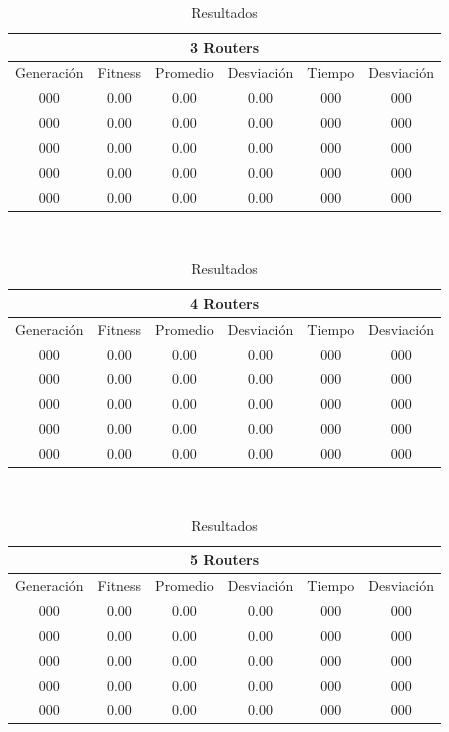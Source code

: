 \documentclass[journal]{IEEEtran}
\begin{document}
\begin{table}[h]
\caption{Resultados}
\centering

\begin{tabular}{|c||c|c|c||c|c|}
\hline
\multicolumn{6}{|c|}{3 Routers}\\
\hline
Generación & Fitness & Promedio & Desviación & Tiempo & Desviación \\
\hline
000 & 0.00 & 0.00 & 0.00 & 000 & 000 \\
000 & 0.00 & 0.00 & 0.00 & 000 & 000 \\
000 & 0.00 & 0.00 & 0.00 & 000 & 000 \\
000 & 0.00 & 0.00 & 0.00 & 000 & 000 \\
000 & 0.00 & 0.00 & 0.00 & 000 & 000 \\
\hline
\end{tabular}
\\[2ex]

\begin{tabular}{|c||c|c|c||c|c|}
\hline
\multicolumn{6}{|c|}{4 Routers}\\
\hline
Generación & Fitness & Promedio & Desviación & Tiempo & Desviación \\
\hline
000 & 0.00 & 0.00 & 0.00 & 000 & 000 \\
000 & 0.00 & 0.00 & 0.00 & 000 & 000 \\
000 & 0.00 & 0.00 & 0.00 & 000 & 000 \\
000 & 0.00 & 0.00 & 0.00 & 000 & 000 \\
000 & 0.00 & 0.00 & 0.00 & 000 & 000 \\
\hline
\end{tabular}
\\[2ex]

\begin{tabular}{|c||c|c|c||c|c|}
\hline
\multicolumn{6}{|c|}{5 Routers}\\
\hline
Generación & Fitness & Promedio & Desviación & Tiempo & Desviación \\
\hline
000 & 0.00 & 0.00 & 0.00 & 000 & 000 \\
000 & 0.00 & 0.00 & 0.00 & 000 & 000 \\
000 & 0.00 & 0.00 & 0.00 & 000 & 000 \\
000 & 0.00 & 0.00 & 0.00 & 000 & 000 \\
000 & 0.00 & 0.00 & 0.00 & 000 & 000 \\
\hline
\end{tabular}
\\[2ex]


\end{table}
\end{document}
